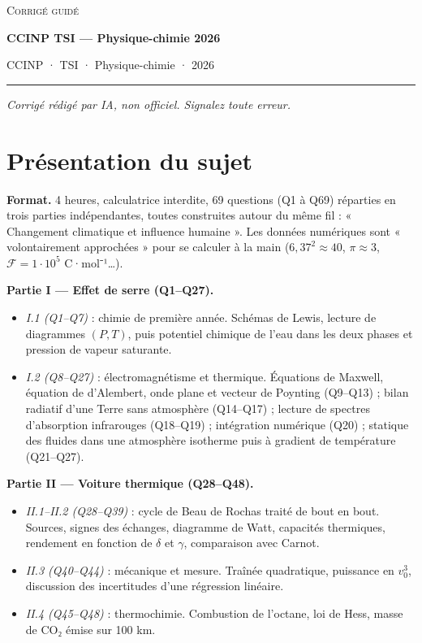 \documentclass[11pt,a4paper]{article}
\providecommand{\tightlist}{\setlength{\itemsep}{0pt}\setlength{\parskip}{0pt}}
\begin{document}
\thispagestyle{plain}
\begin{center}
  {\small\scshape Corrigé guidé}\par\smallskip
  {\LARGE\bfseries CCINP TSI — Physique-chimie 2026\par}\medskip
  {\large CCINP · TSI · Physique-chimie · 2026\par}
\end{center}
\vspace{2pt}\hrule\vspace{8pt}

\emph{Corrigé rédigé par IA, non officiel. Signalez toute erreur.}

\hypertarget{pruxe9sentation-du-sujet}{%
\section{Présentation du sujet}\label{pruxe9sentation-du-sujet}}

\textbf{Format.} 4 heures, calculatrice interdite, 69 questions (Q1 à Q69) réparties en trois parties indépendantes, toutes construites autour du même fil : « Changement climatique et influence humaine ». Les données numériques sont « volontairement approchées » pour se calculer à la main (\(6{,}37^2\approx40\), \(\pi\approx3\), \(\mathcal F=1\cdot10^5\) C·mol⁻¹\ldots).

\textbf{Partie I --- Effet de serre (Q1--Q27).}

\begin{itemize}
\tightlist
\item
  \emph{I.1 (Q1--Q7)} : chimie de première année. Schémas de Lewis, lecture de diagrammes \((P,T)\), puis potentiel chimique de l'eau dans les deux phases et pression de vapeur saturante.
\item
  \emph{I.2 (Q8--Q27)} : électromagnétisme et thermique. Équations de Maxwell, équation de d'Alembert, onde plane et vecteur de Poynting (Q9--Q13) ; bilan radiatif d'une Terre sans atmosphère (Q14--Q17) ; lecture de spectres d'absorption infrarouges (Q18--Q19) ; intégration numérique (Q20) ; statique des fluides dans une atmosphère isotherme puis à gradient de température (Q21--Q27).
\end{itemize}

\textbf{Partie II --- Voiture thermique (Q28--Q48).}

\begin{itemize}
\tightlist
\item
  \emph{II.1--II.2 (Q28--Q39)} : cycle de Beau de Rochas traité de bout en bout. Sources, signes des échanges, diagramme de Watt, capacités thermiques, rendement en fonction de \(\delta\) et \(\gamma\), comparaison avec Carnot.
\item
  \emph{II.3 (Q40--Q44)} : mécanique et mesure. Traînée quadratique, puissance en \(v_0^3\), discussion des incertitudes d'une régression linéaire.
\item
  \emph{II.4 (Q45--Q48)} : thermochimie. Combustion de l'octane, loi de Hess, masse de CO₂ émise sur 100 km.
\end{itemize}
\end{document}

